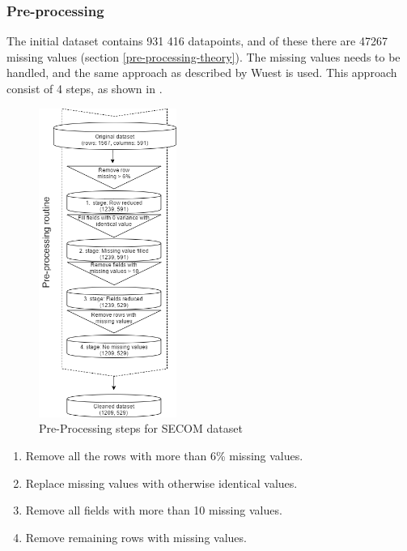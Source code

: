 \documentclass[english, a4paper]{report}
\begin{document}
{{{            \subsubsection{Pre-processing}
            {
                The initial dataset contains 931 416 datapoints, and of these there are 47267 missing values (section \ref{pre-processing-theory}). The missing values needs to be handled, and the same approach as described by Wuest \cite{supervisedMLsecom} is used. This approach consist of 4 steps, as shown in .
                
                \begin{figure}[H]
                    \centering \includegraphics[width=0.4\textwidth]{SECOM-Pre-Process-Steps}
                    \caption{Pre-Processing steps for SECOM dataset}
                    \label{fig:secomPreProcess}
                \end{figure}
                
                \begin{enumerate}
                    \item Remove all the rows with more than 6\% missing values.
                    \item Replace missing values with otherwise identical values.
                    \item Remove all fields with more than 10 missing values.
                    \item Remove remaining rows with missing values.
                \end{enumerate}
                
}}}}
\end{document}
